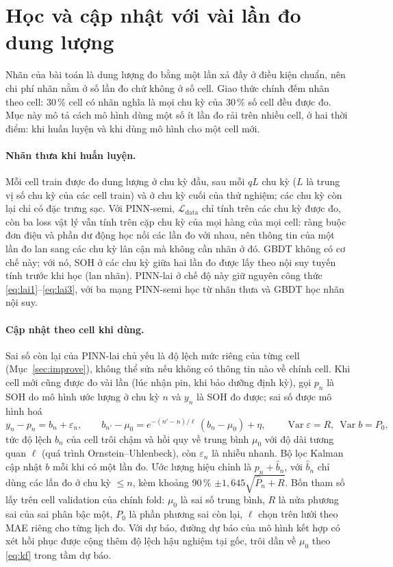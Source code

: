 \documentclass[12pt,a4paper,oneside]{report}
\theoremstyle{plain}
\theoremstyle{definition}
\begin{document}
\section{Học và cập nhật với vài lần đo dung lượng}\label{sec:kalman_m}

Nhãn của bài toán là dung lượng đo bằng một lần xả đầy ở điều kiện chuẩn, nên chi phí nhãn nằm ở số lần đo chứ không ở
số cell. Giao thức chính đếm nhãn theo cell: 30\,\% cell có nhãn nghĩa là mọi chu kỳ của 30\,\% số cell đều được đo.
Mục này mô tả cách mô hình dùng một số ít lần đo rải trên nhiều cell, ở hai thời điểm: khi huấn luyện và khi dùng mô
hình cho một cell mới.

\paragraph{Nhãn thưa khi huấn luyện.} Mỗi cell train được đo dung lượng ở chu kỳ đầu, sau mỗi $qL$ chu kỳ ($L$ là trung
vị số chu kỳ của các cell train) và ở chu kỳ cuối của thử nghiệm; các chu kỳ còn lại chỉ có đặc trưng sạc. Với PINN-semi, $\mathcal{L}_\text{data}$ chỉ tính trên các chu kỳ được
đo, còn ba loss vật lý vẫn tính trên cặp chu kỳ của mọi hàng của mọi cell: ràng buộc đơn điệu và phần dư động học nối
các lần đo với nhau, nên thông tin của một lần đo lan sang các chu kỳ lân cận mà không cần nhãn ở đó. GBDT không có cơ
chế này; với nó, SOH ở các chu kỳ giữa hai lần đo được lấy theo nội suy tuyến tính trước khi học (lan nhãn). PINN-lai
ở chế độ này giữ nguyên công thức \eqref{eq:lai1}--\eqref{eq:lai3}, với ba mạng PINN-semi học từ nhãn thưa và GBDT học
nhãn nội suy.

\paragraph{Cập nhật theo cell khi dùng.} Sai số còn lại của PINN-lai chủ yếu là độ lệch mức riêng của từng cell
(Mục~\ref{sec:improve}), không thể sửa nếu không có thông tin nào về chính cell. Khi cell mới cũng được đo vài lần (lúc
nhận pin, khi bảo dưỡng định kỳ), gọi $p_n$ là SOH do mô hình ước lượng ở chu kỳ $n$ và $y_n$ là SOH đo được; sai số
được mô hình hoá
\begin{equation}\label{eq:kf}
  y_n - p_n = b_n + \varepsilon_n,\qquad
  b_{n'} - \mu_0 = e^{-(n'-n)/\ell}\,(b_n - \mu_0) + \eta,\qquad
  \operatorname{Var}\varepsilon = R,\ \operatorname{Var} b = P_0,
\end{equation}
tức độ lệch $b_n$ của cell trôi chậm và hồi quy về trung bình $\mu_0$ với độ dài tương quan $\ell$ (quá trình
Ornstein--Uhlenbeck), còn $\varepsilon_n$ là nhiễu nhanh. Bộ lọc Kalman cập nhật $b$ mỗi khi có một lần đo. Ước lượng hiệu chỉnh là $p_n + \hat b_n$, với $\hat b_n$ chỉ
dùng các lần đo ở chu kỳ $\le n$, kèm khoảng 90\,\% $\pm 1{,}645\sqrt{\hat P_n + R}$. Bốn tham số lấy trên cell validation
của chính fold: $\mu_0$ là sai số trung bình, $R$ là nửa phương sai của sai phân bậc một, $P_0$ là phần phương sai còn
lại, $\ell$ chọn trên lưới theo MAE riêng cho từng lịch đo. Với dự báo, đường dự báo của mô hình kết hợp có xét hồi phục
được cộng thêm độ lệch hậu nghiệm tại gốc, trôi dần về $\mu_0$ theo \eqref{eq:kf} trong tầm dự báo.
\end{document}

